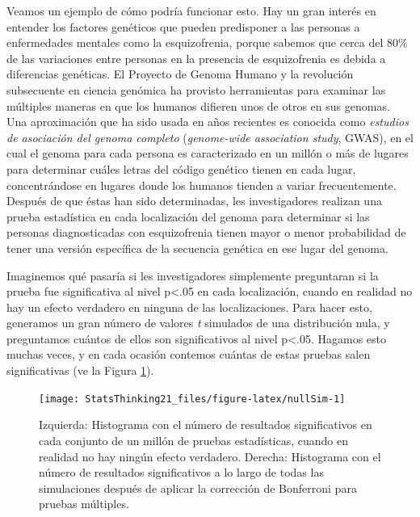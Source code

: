 \documentclass[
  12pt,
]{book}
\begin{document}
Veamos un ejemplo de cómo podría funcionar esto. Hay un gran interés en entender los factores genéticos que pueden predisponer a las personas a enfermedades mentales como la esquizofrenia, porque sabemos que cerca del 80\% de las variaciones entre personas en la presencia de esquizofrenia es debida a diferencias genéticas. El Proyecto de Genoma Humano y la revolución subsecuente en ciencia genómica ha provisto herramientas para examinar las múltiples maneras en que los humanos difieren unos de otros en sus genomas. Una aproximación que ha sido usada en años recientes es conocida como \emph{estudios de asociación del genoma completo} (\emph{genome-wide association study}, GWAS), en el cual el genoma para cada persona es caracterizado en un millón o más de lugares para determinar cuáles letras del código genético tienen en cada lugar, concentrándose en lugares donde los humanos tienden a variar frecuentemente. Después de que éstas han sido determinadas, les investigadores realizan una prueba estadística en cada localización del genoma para determinar si las personas diagnosticadas con esquizofrenia tienen mayor o menor probabilidad de tener una versión específica de la secuencia genética en ese lugar del genoma.

Imaginemos qué pasaría si les investigadores simplemente preguntaran si la prueba fue significativa al nivel p\textless.05 en cada localización, cuando en realidad no hay un efecto verdadero en ninguna de las localizaciones. Para hacer esto, generamos un gran número de valores \emph{t} simulados de una distribución nula, y preguntamos cuántos de ellos son significativos al nivel p\textless.05. Hagamos esto muchas veces, y en cada ocasión contemos cuántas de estas pruebas salen significativas (ve la Figura \ref{fig:nullSim}).

\begin{figure}
\texttt{[image: StatsThinking21\_files/figure-latex/nullSim-1]} \caption{Izquierda: Histograma con el número de resultados significativos en cada conjunto de un millón de pruebas estadísticas, cuando en realidad no hay ningún efecto verdadero. Derecha: Histograma con el número de resultados significativos a lo largo de todas las simulaciones después de aplicar la corrección de Bonferroni para pruebas múltiples.}\label{fig:nullSim}
\end{figure}
\end{document}
